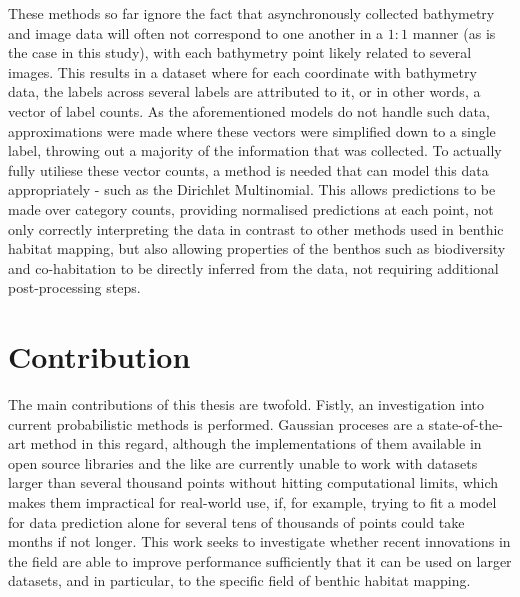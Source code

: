 These methods so far ignore the fact that asynchronously collected bathymetry and image data will often not correspond to one another in a $1:1$ manner (as is the case in this study), with each bathymetry point likely related to several images. This results in a dataset where for each coordinate with bathymetry data, the labels across several labels are attributed to it, or in other words, a vector of label counts. As the aforementioned models do not handle such data, approximations were made where these vectors were simplified down to a single label, throwing out a majority of the information that was collected. To actually fully utiliese these vector counts, a method is needed that can model this data appropriately - such as the Dirichlet Multinomial. This allows predictions to be made over category counts, providing normalised predictions at each point, not only correctly interpreting the data in contrast to other methods used in benthic habitat mapping, but also allowing properties of the benthos such as biodiversity and co-habitation to be directly inferred from the data, not requiring additional post-processing steps.


\section{Contribution}

The main contributions of this thesis are twofold. Fistly, an investigation into current probabilistic methods is performed. Gaussian proceses are a state-of-the-art method in this regard, although the implementations of them available in open source libraries and the like are currently unable to work with datasets larger than several thousand points without hitting computational limits, which makes them impractical for real-world use, if, for example, trying to fit a model for data prediction alone for several tens of thousands of points could take months if not longer. This work seeks to investigate whether recent innovations in the field are able to improve performance sufficiently that it can be used on larger datasets, and in particular, to the specific field of benthic habitat mapping.

